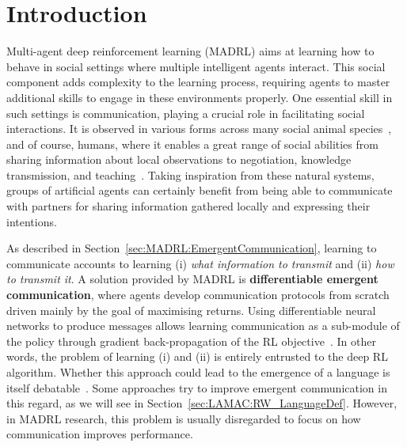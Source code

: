 
\label{ChapterComm} 

\section{Introduction}


Multi-agent deep reinforcement learning (MADRL) aims at learning how to behave in social settings where multiple intelligent agents interact. This social component adds complexity to the learning process, requiring agents to master additional skills to engage in these environments properly. 
One essential skill in such settings is communication, playing a crucial role in facilitating social interactions. It is observed in various forms across many social animal species~\citep{Smith2003_AnimalSignals, Searcy2010_AnimalCommEvo}, and of course, humans, where it enables a great range of social abilities from sharing information about local observations to negotiation, knowledge transmission, and teaching~\citep{Greene2003_Communication}. 
Taking inspiration from these natural systems, groups of artificial agents can certainly benefit from being able to communicate with partners for sharing information gathered locally and expressing their intentions. 

As described in Section~\ref{sec:MADRL:EmergentCommunication}, learning to communicate accounts to learning (i) \textit{what information to transmit} and (ii) \textit{how to transmit it}. A solution provided by MADRL is \textbf{differentiable emergent communication}, where agents develop communication protocols from scratch driven mainly by the goal of maximising returns. Using differentiable neural networks to produce messages allows learning communication as a sub-module of the policy through gradient back-propagation of the RL objective~\citep{Zhu2024_MACSurvey}. In other words, the problem of learning (i) and (ii) is entirely entrusted to the deep RL algorithm. Whether this approach could lead to the emergence of a language is itself debatable~\citep{Lazaridou2020_DeepEmergentComm, Galke2022_Emergent}. Some approaches try to improve emergent communication in this regard, as we will see in Section~\ref{sec:LAMAC:RW_LanguageDef}. However, in MADRL research, this problem is usually disregarded to focus on how communication improves performance. 

